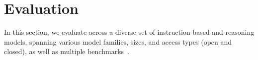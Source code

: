 \section{Evaluation}
\label{sec:exp}
In this section, we evaluate \frameworkname across a diverse set of instruction-based and reasoning models, spanning various model families, sizes, and access types (open and closed), as well as multiple benchmarks~\citep{jain2024livecodebench, li2022competition}.

